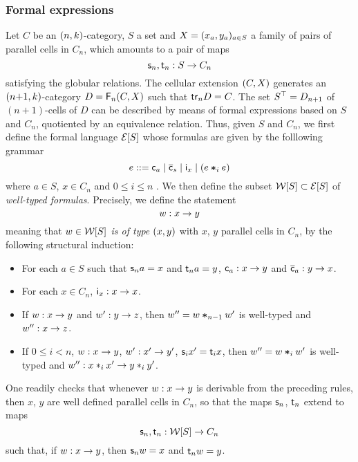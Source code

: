 \subsubsection{Formal expressions}\label{ssubsec:formex}
Let $C$ be an $(n,k)$-category, $S$ a set and $X=(x_a,y_a)_{a\in S}$
a family of pairs of parallel cells in $C_n$, which amounts to a pair
of maps
\[\mathsf{s}_{n},\mathsf{t}_{n}:S\to C_n\]
satisfying the globular relations. The cellular extension
$(C,X)$ generates an $(n{+}1,k)$-category $D=\mathsf{F}_{n}(C,X)$ such that $\mathsf{tr}_{n} D=C$. The set $S^\top=D_{n+1}$ of
$(n{+}1)$-cells of $D$ can be described by means of formal expressions
based on $S$ and $C_n$, quotiented by an equivalence relation. Thus,
given $S$ and $C_n$, we first define the formal language $\mathcal{E}[S]$
whose formulas are given by the folllowing grammar
\[
  e ::= \mathsf{c}_{a} \mid \overline{\mathsf{c}}_{s} \mid \mathsf{i}_{x} \mid (e\bm{\ast}_{i} e)
\]
where $a\in S$, $x\in C_n$ and $0\leq i\leq n$ . We then define the
subset  $\mathcal{W}[S]\subset\mathcal{E}[S]$ of {\em well-typed formulas}.
Precisely, we define the statement
\[w:x\to y\]
meaning that {\em $w\in\mathcal{W}[S]$ is of type $(x,y)$} with $x$, $y$ parallel
cells in $C_n$, by the following structural induction:
\begin{itemize}
\item For each $a\in S$ such that $\mathsf{s}_{n} a=x$ and $\mathsf{t}_{n} a=y$,
  $\mathsf{c}_{a}:x\to y$
  and $\overline{\mathsf{c}}_{a}:y\to x$.
\item For  each $x\in C_n$, $\mathsf{i}_{x}:x\to x$.
 \item If $w:x\to y$ and $w':y\to z$, then $w''=w\bm{\ast}_{n-1}w'$ is
   well-typed and $w'':x\to z$.
 \item If $0\leq i<n$, $w:x\to y$, $w':x'\to y'$, $\mathsf{s}_{i}{x'}=\mathsf{t}_{i}{x}$, then $w''=w\bm{\ast}_{i} w'$ is well-typed and
   $w'':x\ast_{i} x'\to y\ast_{i} y'$. 
 \end{itemize}
 One readily checks that whenever $w:x\to y$ is derivable from the
 preceding rules, then $x$, $y$ are well defined parallel cells in
 $C_n$, so that the maps $\mathsf{s}_{n}$, $\mathsf{t}_{n}$ extend to maps
 \[\mathsf{s}_{n}, \mathsf{t}_{n} :\mathcal{W}[S]\to C_n\]
 such that, if $w:x\to y$,  then $\mathsf{s}_{n} w=x$ and $\mathsf{t}_{n} w=y$. 








 
 
 
